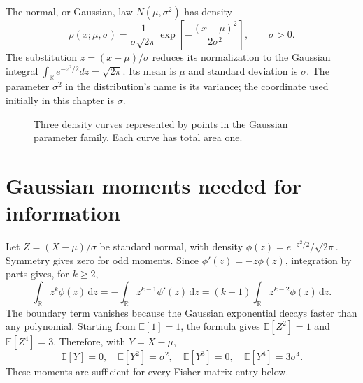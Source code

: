 \documentclass[11pt,oneside,openany]{book}
\theoremstyle{definition}
\theoremstyle{remark}
\newcommand{\R}{\mathbb{R}}
\newcommand{\E}{\mathbb{E}}
\newcommand{\dd}{\,\mathrm{d}}
\numberwithin{equation}{chapter}
\begin{document}
The normal, or Gaussian, law $N(\mu,\sigma^2)$ has density
\begin{equation}\label{eq:gaussiandensity}
\rho(x;\mu,\sigma)=\frac1{\sigma\sqrt{2\pi}}
\exp\left[-\frac{(x-\mu)^2}{2\sigma^2}\right],\qquad \sigma>0.
\end{equation}
The substitution $z=(x-\mu)/\sigma$ reduces its normalization to the Gaussian integral $\int_{\R}e^{-z^2/2}dz=\sqrt{2\pi}$. Its mean is $\mu$ and standard deviation is $\sigma$. The parameter $\sigma^2$ in the distribution's name is its variance; the coordinate used initially in this chapter is $\sigma$.

\begin{figure}[htbp]
\centering
{}
\caption{Three density curves represented by points in the Gaussian parameter family. Each curve has total area one.}
\end{figure}

\section{Gaussian moments needed for information}
Let $Z=(X-\mu)/\sigma$ be standard normal, with density $\phi(z)=e^{-z^2/2}/\sqrt{2\pi}$. Symmetry gives zero for odd moments. Since $\phi'(z)=-z\phi(z)$, integration by parts gives, for $k\geq2$,
\[
\int_{\R}z^k\phi(z)\dd z
=-\int_{\R}z^{k-1}\phi'(z)\dd z
=(k-1)\int_{\R}z^{k-2}\phi(z)\dd z.
\]
The boundary term vanishes because the Gaussian exponential decays faster than any polynomial. Starting from $\E[1]=1$, the formula gives $\E[Z^2]=1$ and $\E[Z^4]=3$. Therefore, with $Y=X-\mu$,
\begin{equation}\label{eq:gaussianmoments}
\E[Y]=0,\quad\E[Y^2]=\sigma^2,\quad
\E[Y^3]=0,\quad\E[Y^4]=3\sigma^4.
\end{equation}
These moments are sufficient for every Fisher matrix entry below.
\end{document}

